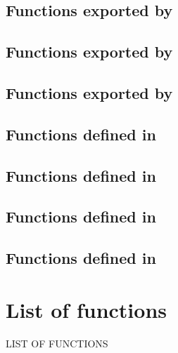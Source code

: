\documentclass[english,a4paper,11pt,oldtoc,mctitle]{rapport3}
\begin{document}
\section{Functions exported by }
\label{sec:menuref}


\section{Functions exported by }
\label{sec:dockref}


\section{Functions exported by }
\label{sec:spref}


\section{Functions defined in }
\label{sec:deref}


\section{Functions defined in }
\label{sec:ioncorelibref}


\section{Functions defined in }
\label{sec:querylibref}


\section{Functions defined in }
\label{sec:menulibref}


\appendix



\chapter*{List of functions}
%
         {\MakeUppercase{List of functions}}%

\makeatletter
\def\fnlisti#1{\@dottedtocline{1}{0em}{1.5em}{\lstinline!#1!}{\pageref{fn:#1}}}
{\parskip\z@}
\makeatother

\begin{htmlonly}
\newcommand{\fnlisti}[1]{\fnref{#1}\\}

\end{htmlonly}


\printindex
\end{document}
